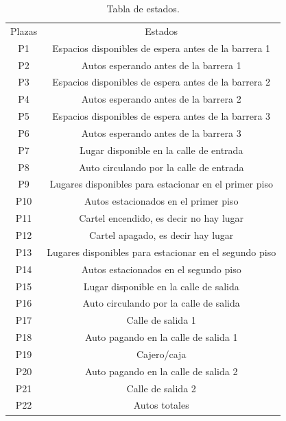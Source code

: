 \documentclass{article}
\begin{document}
	\begin{table}[H]
		\begin{center}
		\begin{tabular}{ |c|c| } 
 			\hline
 			Plazas & Estados \\ 
 			P1 & Espacios disponibles de espera antes de la barrera 1 \\
 			P2 & Autos esperando antes de la barrera 1 \\
 			P3 & Espacios disponibles de espera antes de la barrera 2 \\
 			P4 & Autos esperando antes de la barrera 2 \\
 			P5 & Espacios disponibles de espera antes de la barrera 3 \\
 			P6 & Autos esperando antes de la barrera 3 \\ 
 			P7 & Lugar disponible en la calle de entrada \\
 			P8 & Auto circulando por la calle de entrada \\
 			P9 & Lugares disponibles para estacionar en el primer piso \\
 			P10 & Autos estacionados en el primer piso \\
 			P11 & Cartel encendido, es decir no hay lugar \\
 			P12 & Cartel apagado, es decir hay lugar \\
 			P13 & Lugares disponibles para estacionar en el segundo piso \\
 			P14 & Autos estacionados en el segundo piso \\
 			P15 & Lugar disponible en la calle de salida \\
 			P16 & Auto circulando por la calle de salida\\
 			P17 & Calle de salida 1\\
 			P18 & Auto pagando en la calle de salida 1 \\
 			P19 & Cajero/caja \\ 
 			P20 & Auto pagando en la calle de salida 2 \\
 			P21 &  Calle de salida 2\\
 			P22 & Autos totales \\
 			\hline
		\end{tabular}
		\end{center}
		\caption{Tabla de estados.}
		\label{table:estados}
	\end{table}
\end{document}

